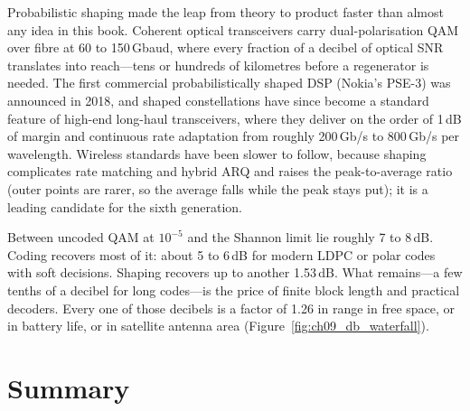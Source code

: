 \begin{inpractice}
Probabilistic shaping made the leap from theory to product faster than almost any idea in this
book. Coherent optical transceivers carry dual-polarisation QAM over fibre at 60 to 150\,Gbaud,
where every fraction of a decibel of optical SNR translates into reach---tens or hundreds of
kilometres before a regenerator is needed. The first commercial probabilistically shaped DSP
(Nokia's PSE-3) was announced in 2018, and shaped constellations have since become a standard
feature of high-end long-haul transceivers, where they deliver on the order of 1\,dB of margin and
continuous rate adaptation from roughly 200\,Gb/s to 800\,Gb/s per wavelength. Wireless standards
have been slower to follow, because shaping complicates rate matching and hybrid ARQ and raises
the peak-to-average ratio (outer points are rarer, so the average falls while the peak stays put);
it is a leading candidate for the sixth generation.
\end{inpractice}

\begin{keyidea}
Between uncoded QAM at $10^{-5}$ and the Shannon limit lie roughly 7 to 8\,dB. Coding recovers most
of it: about 5 to 6\,dB for modern LDPC or polar codes with soft decisions. Shaping recovers up to
another 1.53\,dB. What remains---a few tenths of a decibel for long codes---is the price of finite
block length and practical decoders. Every one of those decibels is a factor of 1.26 in range in free
space, or in battery life, or in satellite antenna area (Figure~\ref{fig:ch09_db_waterfall}).
\end{keyidea}


\section{Summary}
\label{sec:ch09:summary}

